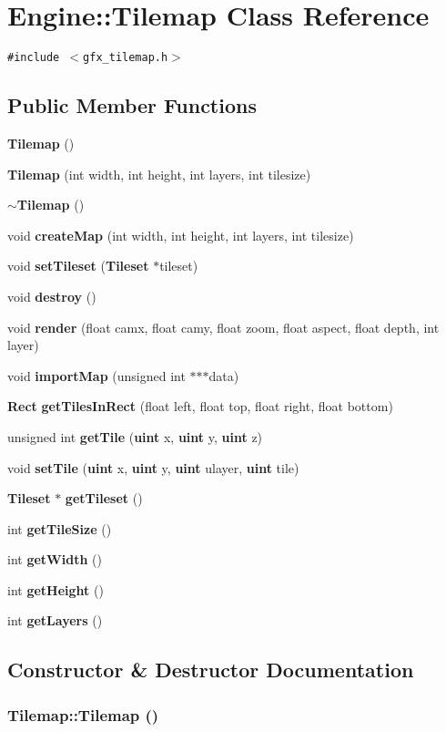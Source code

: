 \section{Engine::Tilemap Class Reference}
\label{classEngine_1_1Tilemap}
{\tt \#include $<$gfx\_\-tilemap.h$>$}

\subsection*{Public Member Functions}
\begin{CompactItemize}
\item 
{\bf Tilemap} ()
\item 
{\bf Tilemap} (int width, int height, int layers, int tilesize)
\item 
{\bf $\sim$Tilemap} ()
\item 
void {\bf createMap} (int width, int height, int layers, int tilesize)
\item 
void {\bf setTileset} ({\bf Tileset} $\ast$tileset)
\item 
void {\bf destroy} ()
\item 
void {\bf render} (float camx, float camy, float zoom, float aspect, float depth, int layer)
\item 
void {\bf importMap} (unsigned int $\ast$$\ast$$\ast$data)
\item 
{\bf Rect} {\bf getTilesInRect} (float left, float top, float right, float bottom)
\item 
unsigned int {\bf getTile} ({\bf uint} x, {\bf uint} y, {\bf uint} z)
\item 
void {\bf setTile} ({\bf uint} x, {\bf uint} y, {\bf uint} ulayer, {\bf uint} tile)
\item 
{\bf Tileset} $\ast$ {\bf getTileset} ()
\item 
int {\bf getTileSize} ()
\item 
int {\bf getWidth} ()
\item 
int {\bf getHeight} ()
\item 
int {\bf getLayers} ()
\end{CompactItemize}


\subsection{Constructor \& Destructor Documentation}
\subsubsection{\setlength{\rightskip}{0pt plus 5cm}Tilemap::Tilemap ()}\label{classEngine_1_1Tilemap_5adfb872738c2e159824a49267b8df73}


